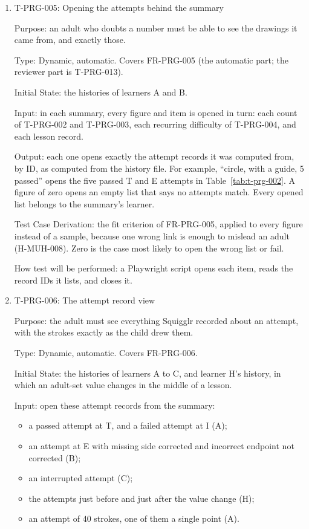 \documentclass[12pt, titlepage]{article}
\newcommand{\testitem}[1]{\item #1\par\nopagebreak}
\begin{document}
\begin{enumerate}
How test will be performed: a Playwright script reads the list of recurring
difficulties and compares it with the table.

\testitem{T-PRG-005: Opening the attempts behind the summary}

Purpose: an adult who doubts a number must be able to see the drawings it
came from, and exactly those.

Type: Dynamic, automatic. Covers FR-PRG-005 (the automatic part; the
reviewer part is T-PRG-013).

Initial State: the histories of learners A and B.

Input: in each summary, every figure and item is opened in turn: each count
of T-PRG-002 and T-PRG-003, each recurring difficulty of T-PRG-004, and each
lesson record.

Output: each one opens exactly the attempt records it was computed from, by
ID, as computed from the history file. For example, ``circle, with a guide,
5 passed'' opens the five passed T and E attempts in
Table~\ref{tab:t-prg-002}. A figure of zero opens an empty list that says no
attempts match. Every opened list belongs to the summary's learner.

Test Case Derivation: the fit criterion of FR-PRG-005, applied to every figure
instead of a sample, because one wrong link is enough to mislead an adult
(H-MUH-008). Zero is the case most likely to open the wrong list or fail.

How test will be performed: a Playwright script opens each item, reads the
record IDs it lists, and closes it.

\testitem{T-PRG-006: The attempt record view}

Purpose: the adult must see everything Squigglr recorded about an attempt,
with the strokes exactly as the child drew them.

Type: Dynamic, automatic. Covers FR-PRG-006.

Initial State: the histories of learners A to C, and learner H's history,
in which an adult-set value changes in the middle of a lesson.

Input: open these attempt records from the summary:
\begin{itemize}
\item[(a)] a passed attempt at T, and a failed attempt at I (A);
\item[(b)] an attempt at E with missing side corrected and incorrect
endpoint not corrected (B);
\item[(c)] an interrupted attempt (C);
\item[(d)] the attempts just before and just after the value change
(H);
\item[(e)] an attempt of 40 strokes, one of them a single point (A).
\end{itemize}


\end{enumerate}
\end{document}
